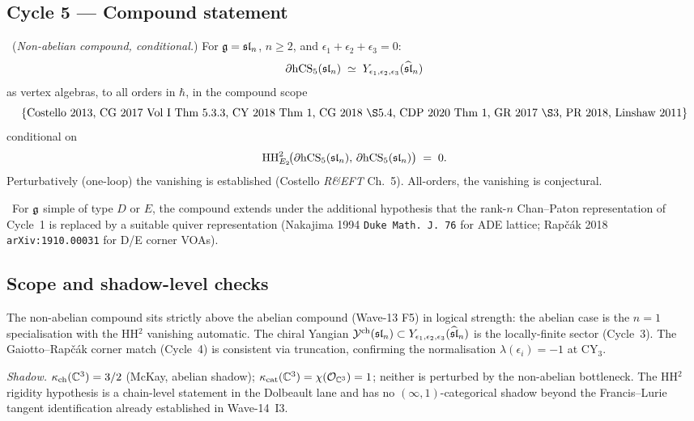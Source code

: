 \subsection{Cycle 5 --- Compound statement}

\ClaimStatusTheorem\ (\emph{Non-abelian compound, conditional.})
For $\mathfrak{g}=\mathfrak{sl}_n$, $n\ge 2$, and $\epsilon_1+\epsilon_2+\epsilon_3=0$:
\[
  \partial\mathrm{hCS}_5(\mathfrak{sl}_n)
  \;\simeq\;
  Y_{\epsilon_1,\epsilon_2,\epsilon_3}(\widehat{\mathfrak{sl}}_n)
\]
as vertex algebras, to all orders in $\hbar$, in the compound scope
\[
  \{\text{Costello 2013, CG 2017 Vol~I Thm~5.3.3, CY 2018 Thm~1,
  CG 2018 \S5.4, CDP 2020 Thm~1, GR 2017 \S3, PR 2018,
  Linshaw 2011}\}
\]
conditional on
\[
  \mathrm{HH}^2_{E_2}\!\bigl(\partial\mathrm{hCS}_5(\mathfrak{sl}_n),\,
  \partial\mathrm{hCS}_5(\mathfrak{sl}_n)\bigr) \;=\; 0.
\]
Perturbatively (one-loop) the vanishing is established (Costello
\emph{R\&EFT} Ch.~5). All-orders, the vanishing is conjectural.

\ClaimStatusConjectured\ For $\mathfrak{g}$ simple of type $D$ or $E$, the
compound extends under the additional hypothesis that the rank-$n$
Chan--Paton representation of Cycle~1 is replaced by a suitable
quiver representation (Nakajima 1994 \texttt{Duke Math.~J.~76}
for ADE lattice; Rapčák 2018 \texttt{arXiv:1910.00031} for D/E
corner VOAs).

\subsection{Scope and shadow-level checks}

The non-abelian compound sits strictly above the abelian compound
(Wave-13 F5) in logical strength: the abelian case is the $n=1$
specialisation with the HH${}^2$ vanishing automatic. The chiral
Yangian $\mathcal{Y}^{\mathrm{ch}}(\mathfrak{sl}_n)\subset Y_{\epsilon_1,\epsilon_2,\epsilon_3}(\widehat{\mathfrak{sl}}_n)$ is the
locally-finite sector (Cycle~3). The Gaiotto--Rapčák corner match
(Cycle~4) is consistent via truncation, confirming the
normalisation $\lambda(\epsilon_i)=-1$ at CY${}_3$.

\emph{Shadow.} $\kappa_{\mathrm{ch}}(\mathbb{C}^3)=3/2$ (McKay, abelian shadow);
$\kappa_{\mathrm{cat}}(\mathbb{C}^3)=\chi(\mathcal{O}_{\mathbb{C}^3})=1$; neither is perturbed by the
non-abelian bottleneck. The HH${}^2$ rigidity hypothesis is a
chain-level statement in the Dolbeault lane and has no
$(\infty,1)$-categorical shadow beyond the Francis--Lurie tangent
identification already established in Wave-14~I3.
